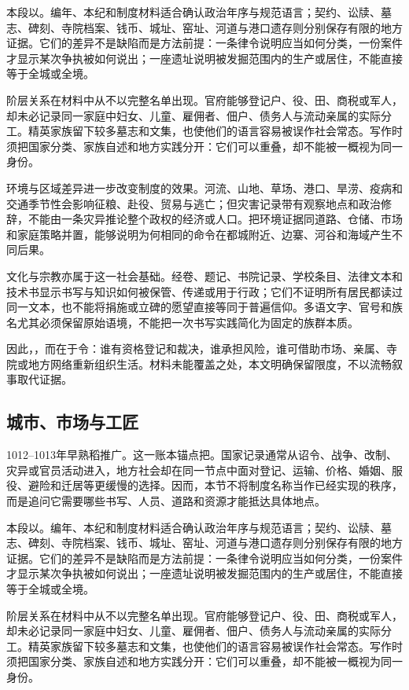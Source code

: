 本段以。编年、本纪和制度材料适合确认政治年序与规范语言；契约、讼牍、墓志、碑刻、寺院档案、钱币、城址、窑址、河道与港口遗存则分别保存有限的地方证据。它们的差异不是缺陷而是方法前提：一条律令说明应当如何分类，一份案件才显示某次争执被如何说出；一座遗址说明被发掘范围内的生产或居住，不能直接等于全城或全境。

阶层关系在材料中从不以完整名单出现。官府能够登记户、役、田、商税或军人，却未必记录同一家庭中妇女、儿童、雇佣者、佃户、债务人与流动亲属的实际分工。精英家族留下较多墓志和文集，也使他们的语言容易被误作社会常态。写作时须把国家分类、家族自述和地方实践分开：它们可以重叠，却不能被一概视为同一身份。

环境与区域差异进一步改变制度的效果。河流、山地、草场、港口、旱涝、疫病和交通季节性会影响征粮、赴役、贸易与逃亡；但灾害记录带有观察地点和政治修辞，不能由一条灾异推论整个政权的经济或人口。把环境证据同道路、仓储、市场和家庭策略并置，能够说明为何相同的命令在都城附近、边寨、河谷和海域产生不同后果。

文化与宗教亦属于这一社会基础。经卷、题记、书院记录、学校条目、法律文本和技术书显示书写与知识如何被保管、传递或用于行政；它们不证明所有居民都读过同一文本，也不能将捐施或立碑的愿望直接等同于普遍信仰。多语文字、官号和族名尤其必须保留原始语境，不能把一次书写实践简化为固定的族群本质。

因此，，而在于令：谁有资格登记和裁决，谁承担风险，谁可借助市场、亲属、寺院或地方网络重新组织生活。材料未能覆盖之处，本文明确保留限度，不以流畅叙事取代证据。

\subsection{城市、市场与工匠}

1012--1013年早熟稻推广。这一账本锚点把。国家记录通常从诏令、战争、改制、灾异或官员活动进入，地方社会却在同一节点中面对登记、运输、价格、婚姻、服役、避险和迁居等更缓慢的选择。因而，本节不将制度名称当作已经实现的秩序，而是追问它需要哪些书写、人员、道路和资源才能抵达具体地点。

本段以。编年、本纪和制度材料适合确认政治年序与规范语言；契约、讼牍、墓志、碑刻、寺院档案、钱币、城址、窑址、河道与港口遗存则分别保存有限的地方证据。它们的差异不是缺陷而是方法前提：一条律令说明应当如何分类，一份案件才显示某次争执被如何说出；一座遗址说明被发掘范围内的生产或居住，不能直接等于全城或全境。

阶层关系在材料中从不以完整名单出现。官府能够登记户、役、田、商税或军人，却未必记录同一家庭中妇女、儿童、雇佣者、佃户、债务人与流动亲属的实际分工。精英家族留下较多墓志和文集，也使他们的语言容易被误作社会常态。写作时须把国家分类、家族自述和地方实践分开：它们可以重叠，却不能被一概视为同一身份。

